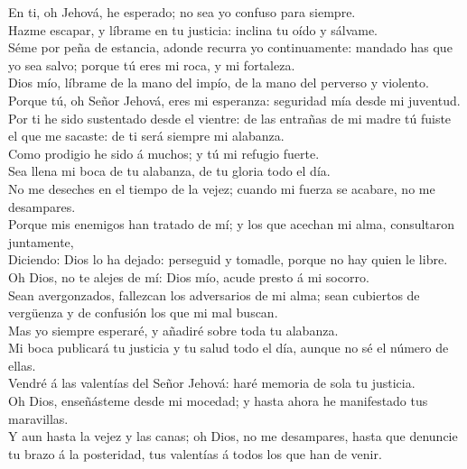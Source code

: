  En ti, oh Jehová, he esperado; no sea yo confuso para
siempre.\\
 Hazme escapar, y líbrame en tu justicia: inclina tu oído
y sálvame.\\
 Séme por peña de estancia, adonde recurra yo
continuamente: mandado has que yo sea salvo; porque tú eres mi roca, y
mi fortaleza.\\
 Dios mío, líbrame de la mano del impío, de la mano del
perverso y violento.\\
 Porque tú, oh Señor Jehová, eres mi esperanza: seguridad
mía desde mi juventud.\\
 Por ti he sido sustentado desde el vientre: de las
entrañas de mi madre tú fuiste el que me sacaste: de ti será siempre mi
alabanza.\\
 Como prodigio he sido á muchos; y tú mi refugio fuerte.\\
 Sea llena mi boca de tu alabanza, de tu gloria todo el
día.\\
 No me deseches en el tiempo de la vejez; cuando mi fuerza
se acabare, no me desampares.\\
 Porque mis enemigos han tratado de mí; y los que acechan
mi alma, consultaron juntamente,\\
 Diciendo: Dios lo ha dejado: perseguid y tomadle, porque
no hay quien le libre.\\
 Oh Dios, no te alejes de mí: Dios mío, acude presto á mi
socorro.\\
 Sean avergonzados, fallezcan los adversarios de mi alma;
sean cubiertos de vergüenza y de confusión los que mi mal buscan.\\
 Mas yo siempre esperaré, y añadiré sobre toda tu
alabanza.\\
 Mi boca publicará tu justicia y tu salud todo el día,
aunque no sé el número de ellas.\\
 Vendré á las valentías del Señor Jehová: haré memoria de
sola tu justicia.\\
 Oh Dios, enseñásteme desde mi mocedad; y hasta ahora he
manifestado tus maravillas.\\
 Y aun hasta la vejez y las canas; oh Dios, no me
desampares, hasta que denuncie tu brazo á la posteridad, tus valentías á
todos los que han de venir.\\
